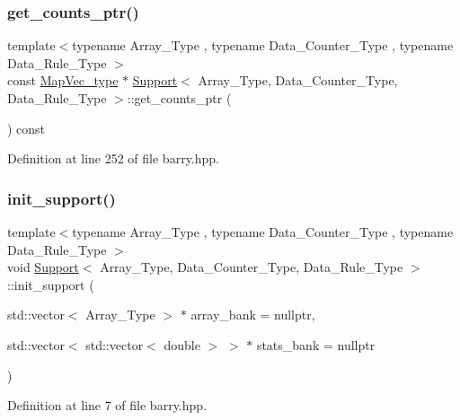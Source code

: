 \subsubsection{\texorpdfstring{get\+\_\+counts\+\_\+ptr()}{get\_counts\_ptr()}}
{\footnotesize\ttfamily template$<$typename Array\+\_\+\+Type , typename Data\+\_\+\+Counter\+\_\+\+Type , typename Data\+\_\+\+Rule\+\_\+\+Type $>$ \\
const \hyperlink{namespacebarry_a2f0d3aab1d67e4c8eaeab9022e16139f}{Map\+Vec\+\_\+type} $\ast$ \hyperlink{classbarry_1_1_support}{Support}$<$ Array\+\_\+\+Type, Data\+\_\+\+Counter\+\_\+\+Type, Data\+\_\+\+Rule\+\_\+\+Type $>$\+::get\+\_\+counts\+\_\+ptr (\begin{DoxyParamCaption}{ }\end{DoxyParamCaption}) const\hspace{0.3cm}{\ttfamily [inline]}}



Definition at line 252 of file barry.\+hpp.

\mbox{\label{classbarry_1_1_support_a013872a55ffd6a0a931e124da8e8dc99}} 
\subsubsection{\texorpdfstring{init\+\_\+support()}{init\_support()}}
{\footnotesize\ttfamily template$<$typename Array\+\_\+\+Type , typename Data\+\_\+\+Counter\+\_\+\+Type , typename Data\+\_\+\+Rule\+\_\+\+Type $>$ \\
void \hyperlink{classbarry_1_1_support}{Support}$<$ Array\+\_\+\+Type, Data\+\_\+\+Counter\+\_\+\+Type, Data\+\_\+\+Rule\+\_\+\+Type $>$\+::init\+\_\+support (\begin{DoxyParamCaption}\item[{std\+::vector$<$ Array\+\_\+\+Type $>$ $\ast$}]{array\+\_\+bank = {\ttfamily nullptr},  }\item[{std\+::vector$<$ std\+::vector$<$ double $>$ $>$ $\ast$}]{stats\+\_\+bank = {\ttfamily nullptr} }\end{DoxyParamCaption})\hspace{0.3cm}{\ttfamily [inline]}}



Definition at line 7 of file barry.\+hpp.

